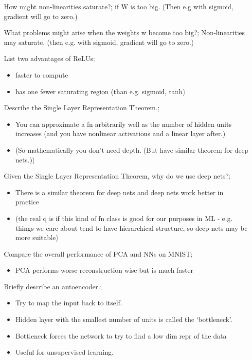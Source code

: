 \documentclass{article}
\begin{document}
How might non-linearities saturate?; if W is too big. (Then e.g with sigmoid, gradient will go to zero.)

What problems might arise when the weights w become too big?; Non-linearities may saturate. (then e.g. with sigmoid, gradient will go to zero.)

List two advantages of ReLUs; \begin{itemize}
    \item faster to compute
    \item has one fewer saturating region (than e.g. sigmoid, tanh)
\end{itemize}

Describe the Single Layer Representation Theorem.; \begin{itemize}
    \item You can approximate a fn arbitrarily well as the number of hidden units increases (and you have nonlinear activations and a linear layer after.)
    \item (So mathematically you don't need depth. (But have similar theorem for deep nets.))
\end{itemize}

Given the Single Layer Representation Theorem, why do we use deep nets?; \begin{itemize}
    \item There is a similar theorem for deep nets and deep nets work better in practice
    \item (the real q is if this kind of fn class is good for our purposes in ML - e.g. things we care about tend to have hierarchical structure, so deep nets may be more suitable)
\end{itemize}

Compare the overall performance of PCA and NNs on MNIST; \begin{itemize}
    \item PCA performs worse reconstruction wise but is much faster
\end{itemize}

Briefly describe an autoencoder.; \begin{itemize}
    \item Try to map the input back to itself.
    \item Hidden layer with the smallest number of units is called the `bottleneck'.
    \item Bottleneck forces the network to try to find a low dim repr of the data
    \item Useful for unsupervised learning.
\end{itemize}
\end{document}
